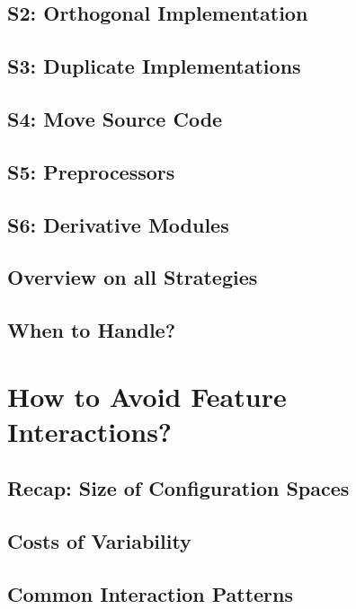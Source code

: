 \subsection{S2: Orthogonal Implementation}
\subsection{S3: Duplicate Implementations}
\subsection{S4: Move Source Code}
\subsection{S5: Preprocessors}
\subsection{S6: Derivative Modules}
\subsection{Overview on all Strategies}
\subsection{When to Handle?}

%

\lessonslearned{
	\item \ldots
}{
	\item \ldots
}{
	\ldots
}

\sectionend

\section{How to Avoid Feature Interactions?}

\subsection{Recap: Size of Configuration Spaces}
\subsection{Costs of Variability}
\subsection{Common Interaction Patterns}
